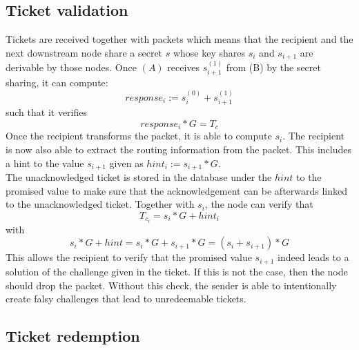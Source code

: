 \subsection{Ticket validation}
Tickets are received together with packets which means that the recipient and the next downstream node share a secret $s$ whose key shares $s_i$ and $s_{i+1}$ are derivable by those nodes.
\newline Once $(A)$ receives $s_{i+1}^{(1)}$ from (B) by the secret sharing, it can compute: $$response_i:=s_i^{(0)}+s_{i+1}^{(1)}$$ such that it verifies  
$$response_i*G=T_c$$
Once the recipient transforms the packet, it is able to compute $s_i$. The recipient is now also able to extract the routing information from the packet. 
This includes a hint to the value $s_{i+1}$ given as $hint_i:=s_{i+1}*G$.
\\The unacknowledged ticket is stored in the database under the $hint$ to the promised value to make sure that the acknowledgement can be afterwards linked to the unacknowledged ticket.
\newline Together with $s_i$, the node can verify that $$T_{c_i}=s_i*G+hint_i$$ with $$s_i*G+hint=s_i*G+s_{i+1}*G=(s_i+s_{i+1})*G$$ 
This allows the recipient to verify that the promised value $s_{i+1}$ indeed leads to a solution of the challenge given in the ticket. 
If this is not the case, then the node should drop the packet.
\newline Without this check, the sender is able to intentionally create falsy challenges that lead to unredeemable tickets.


\subsection{Ticket redemption}


